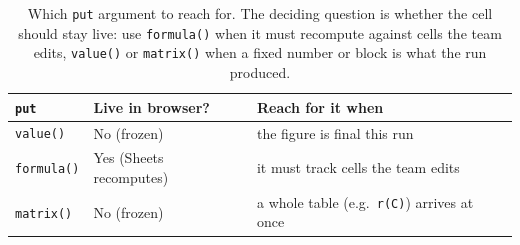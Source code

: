 \begin{table}[htbp]
\centering
\footnotesize
\caption[Choosing among put's writing modes]{Which \texttt{put} argument to reach for. The deciding question is whether the cell should stay live: use \texttt{formula()} when it must recompute against cells the team edits, \texttt{value()} or \texttt{matrix()} when a fixed number or block is what the run produced.}
\label{tab:ch11-viz-put}
\begin{tabular}{@{}llp{8.6cm}@{}}
\toprule
\texttt{put} & Live in browser? & Reach for it when \\
\midrule
\texttt{value()}   & No (frozen)  & the figure is final this run \\
\texttt{formula()} & Yes (Sheets recomputes) & it must track cells the team edits \\
\texttt{matrix()}  & No (frozen)  & a whole table (e.g.\ \texttt{r(C)}) arrives at once \\
\bottomrule
\end{tabular}
\end{table}

